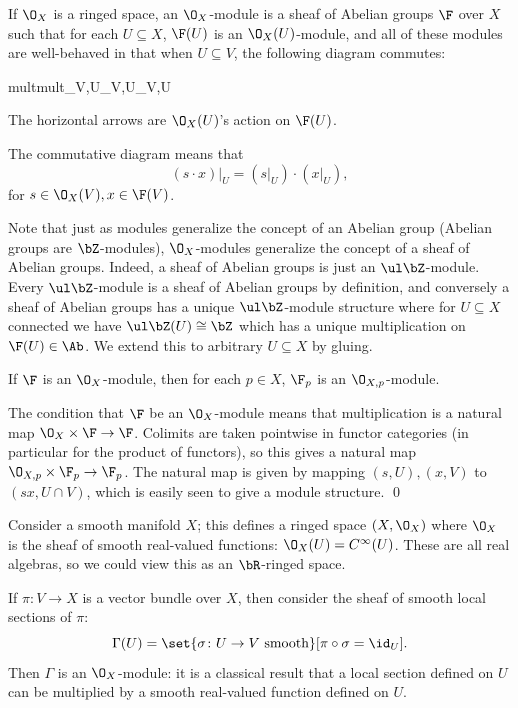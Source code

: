 \edefn

\bdefn[name={sheafmod}]

    If $\O_X$ is a ringed space, an {\emphcolor $\O_X$-module} is a sheaf of Abelian groups $\F$ over $X$ such that for each $U\subseteq X$,
    $\F(U)$ is an $\O_X(U)$-module, and all of these modules are well-behaved in that when $U\subseteq V$, the following diagram commutes:

        {{\rm mult}}{{\rm mult}}{\res_{V,U}\times\res_{V,U}}{\res_{V,U}}

    The horizontal arrows are $\O_X(U)$'s action on $\F(U)$.

\edefn

The commutative diagram means that
$$ (s\cdot x)|_U = (s|_U)\cdot(x|_U) , $$
for $s\in\O_X(V),x\in\F(V)$.

Note that just as modules generalize the concept of an Abelian group (Abelian groups are $\bZ$-modules), $\O_X$-modules generalize the concept
of a sheaf of Abelian groups.
Indeed, a sheaf of Abelian groups is just an $\ul\bZ$-module.
Every $\ul\bZ$-module is a sheaf of Abelian groups by definition, and conversely a sheaf of Abelian groups has a unique $\ul\bZ$-module structure
where for $U\subseteq X$ connected we have $\ul\bZ(U)\cong\bZ$ which has a unique multiplication on $\F(U)\in\Ab$.
We extend this to arbitrary $U\subseteq X$ by gluing.

\bprop

    If $\F$ is an $\O_X$-module, then for each $p\in X$, $\F_p$ is an $\O_{X,p}$-module.

\eprop

\bproof

    The condition that $\F$ be an $\O_X$-module means that multiplication is a natural map $\O_X\times\F\to\F$.
    Colimits are taken pointwise in functor categories (in particular for the product of functors), so this gives a natural map
    $\O_{X,p}\times\F_p\to\F_p$.
    The natural map is given by mapping $(s,U),(x,V)$ to $(sx,U\cap V)$, which is easily seen to give a module structure.
    \qed

\eproof

\bexam

    Consider a smooth manifold $X$; this defines a ringed space $(X,\O_X)$ where $\O_X$ is the sheaf of smooth real-valued functions:
    $\O_X(U)=C^\infty(U)$.
    These are all real algebras, so we could view this as an $\bR$-ringed space.

    If $\pi\colon V\to X$ is a vector bundle over $X$, then consider the sheaf of smooth local sections of $\pi$:
    $$ \Gamma(U) = \set{\sigma\colon U\to V\hbox{ smooth}}[\pi\circ\sigma=\id_U] . $$
    Then $\Gamma$ is an $\O_X$-module: it is a classical result that a local section defined on $U$ can be multiplied by a smooth real-valued
    function defined on $U$.

\eexam

